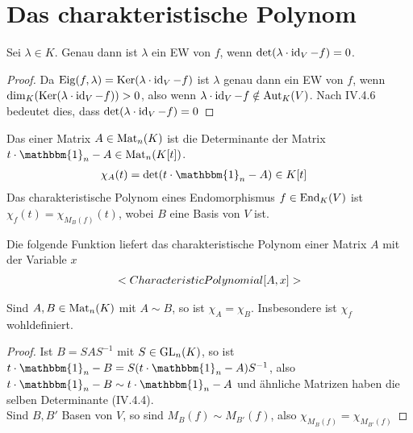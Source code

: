 \section{Das charakteristische Polynom}

\begin{proposition}
	Sei $\lambda\in K$. Genau dann ist $\lambda$ ein EW von $f$, wenn $\det(\lambda\cdot\id_V-f)=0$.
\end{proposition}
\begin{proof}
	Da $\Eig(f,\lambda)=\Ker(\lambda\cdot\id_V-f)$ ist $\lambda$ genau dann ein EW von $f$, wenn $\dim_K(\Ker(\lambda\cdot\id_V-f))>0$, also wenn $\lambda\cdot\id_V-f\notin\Aut_K(V)$. Nach IV.4.6 bedeutet dies, dass $\det(\lambda\cdot\id_V-f)=0$ %
\end{proof}

\begin{definition}
	Das  einer Matrix $A\in\Mat_n(K)$ ist die Determinante der Matrix $t\cdot \mathbbm{1}_n-A\in\Mat_n(K[t])$. 
	\begin{align}
		\chi_A(t)&=\det(t\cdot \mathbbm{1}_n-A)\in K[t] \notag
	\end{align}
	Das charakteristische Polynom eines Endomorphismus $f\in\End_K(V)$ ist $\chi_f(t)=\chi_{M_B(f)}(t)$, wobei $B$ eine Basis von $V$ ist.
\end{definition}

\begin{mathematica}
	Die folgende Funktion liefert das charakteristische Polynom einer Matrix $A$ mit der Variable $x$
	\begin{align}
		\texttt{CharacteristicPolynomial[A,x]}\notag
	\end{align}
\end{mathematica}

\begin{proposition}
	Sind $A,B\in\Mat_n(K)$ mit $A\sim B$, so ist $\chi_A=\chi_B$. Insbesondere ist $\chi_f$ wohldefiniert.
\end{proposition}
\begin{proof}
	Ist $B=SAS^{-1}$ mit $S\in\GL_n(K)$, so ist $t\cdot \mathbbm{1}_n-B = S(t\cdot \mathbbm{1}_n-A)S^{-1}$, also $t\cdot \mathbbm{1}_n-B\sim t\cdot \mathbbm{1}_n-A$ und ähnliche Matrizen haben die selben Determinante (IV.4.4). \\
	Sind $B,B'$ Basen von $V$, so sind $M_B(f)\sim M_{B'}(f)$, also $\chi_{M_B(f)}=\chi_{M_{B'}(f)}$ %
\end{proof}

